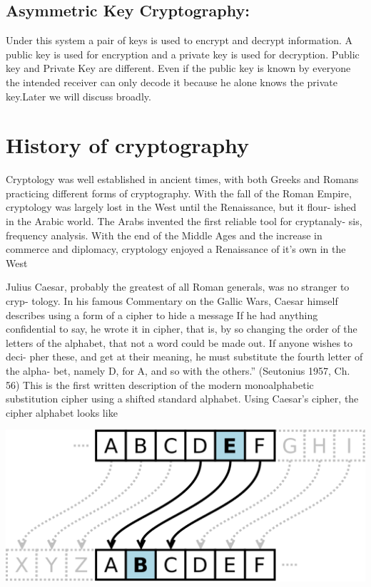 \documentclass{report}
\theoremstyle{definition}
\begin{document}
{{\subsection{Asymmetric Key Cryptography:}
\Large{Under this system a pair of keys is used to encrypt and decrypt information. A public key is used for encryption and a private key is used for decryption. Public key and Private Key are different. Even if the public key is known by everyone the intended receiver can only decode it because he alone knows the private key.Later we will discuss broadly. }


\section{History of cryptography}
\Large{Cryptology was well established in ancient times, with both Greeks and
Romans practicing different forms of cryptography. With the fall of the Roman
Empire, cryptology was largely lost in the West until the Renaissance, but it flour-
ished in the Arabic world. The Arabs invented the first reliable tool for cryptanaly-
sis, frequency analysis. With the end of the Middle Ages and the increase in
commerce and diplomacy, cryptology enjoyed a Renaissance of it’s own in the
West


Julius Caesar, probably the greatest of all Roman generals, was no stranger to cryp-
tology. In his famous Commentary on the Gallic Wars, Caesar himself describes
using a form of a cipher to hide a message If he had anything confidential to say, he wrote it in cipher, that is, by so changing the order of the
letters of the alphabet, that not a word could be made out. If anyone wishes to deci-
pher these, and get at their meaning, he must substitute the fourth letter of the alpha-
bet, namely D, for A, and so with the others.” (Seutonius 1957, Ch. 56) This is the
first written description of the modern monoalphabetic substitution cipher using a
shifted standard alphabet. Using Caesar’s cipher, the cipher alphabet looks like}

\begin{center}
\includegraphics[scale=0.3]{"ceser.png"}
\end{center}

}}
\end{document}
